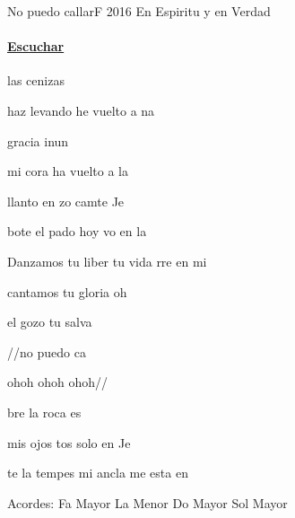 \documentclass[12pt, spanish]{book}
\begin{document}
    \begin{song}{No puedo callar}{F}
        {2016} %
        {En Espiritu y en Verdad}
        {} %
        {}
        \ifChordBk
        \paragraph{\mbox{}\hfill\protect\href{https://open.spotify.com/intl-es/track/2sIucCEjs380R7cSHNsxgk}{Escuchar}\mbox{}\hfill}
        \fi



        \begin{SBOpGroup}
             las cenizas 

            haz levando he vuelto a na

             gracia inun

            mi cora ha vuelto a la
        \end{SBOpGroup}

        \begin{SBOpGroup}
             llanto en zo camte Je

            bote el pado hoy vo en la 
        \end{SBOpGroup}

        \begin{SBChorus}
            Danzamos  tu liber tu vida rre en mi 

            cantamos  tu gloria oh 

            el gozo  tu salva

            //no puedo ca

            ohoh  ohoh ohoh//
        \end{SBChorus}


        \begin{SBOpGroup}
            bre la roca es

            mis ojos tos solo en Je

            te la tempes mi ancla me esta en 
        \end{SBOpGroup}

        \ifChordBk
        \begin{SBOpGroup}
            Acordes:\break
            \upchord{\F}\qquad Fa Mayor \hfill
            \upchord{\Am}\qquad La Menor \hfill\null\break
            \upchord{\C}\qquad Do Mayor \hfill
            \upchord{\G}\qquad Sol Mayor \hfill\null\break
        \end{SBOpGroup}
        \fi
    \end{song}
\end{document}
